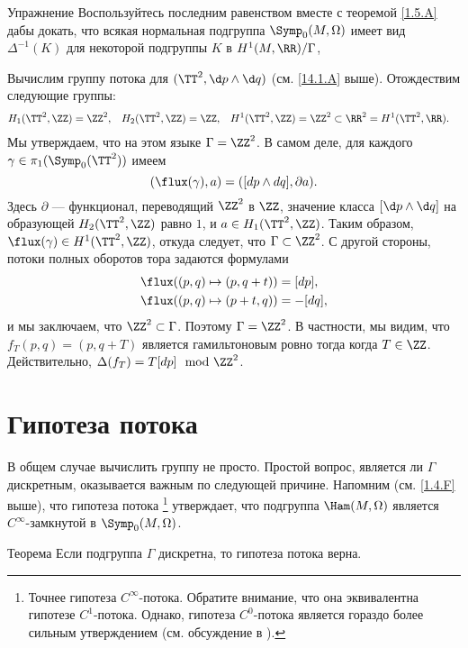 \begin{ex}{Упражнение}\label{14.1.B}
Воспользуйтесь последним равенством вместе с теоремой \ref{1.5.A} дабы докать, что всякая нормальная подгруппа $\Symp_0(M,\Omega)$ имеет вид $\Delta^{-1}(K)$ для некоторой подгруппы $K$ в $H^1(M, \RR)/\Gamma$,
\end{ex}

Вычислим группу потока для $(\TT^2,\d p\wedge \d q)$ (см. \ref{14.1.A} выше).
Отождествим следующие группы: 
\begin{align*}
H_1(\TT^2,\ZZ)&=\ZZ^2,
&
H_2(\TT^2,\ZZ)&=\ZZ,
&
H^1(\TT^2,\ZZ)&=\ZZ^2
\subset
\RR^2=
H^1(\TT^2,\RR).
\end{align*}
Мы утверждаем, что на этом языке $\Gamma = \ZZ^2$.
В самом деле, для каждого $\gamma\in\pi_1(\Symp_0(\TT^2))$ имеем 
\[(\flux(\gamma), a) = ([dp \wedge dq], \partial a).\]
Здесь $\partial$ --- функционал, переводящий $\ZZ^2$ в $\ZZ$, значение
класса $[\d p \wedge \d q]$ на образующей $H_2 (\TT^2,\ZZ)$ равно $1$,
и $a \in H_1 (\TT^2, \ZZ)$. 
Таким образом, $\flux(\gamma)\in H^1(\TT^2,\ZZ)$, откуда следует, что
$\Gamma\subset \ZZ^2$.
С другой стороны, потоки полных оборотов тора задаются формулами 
\begin{align*}
\flux( (p, q) \mapsto (p , q+ t))
&=
[dp],
\\
\flux( (p, q) \mapsto (p+ t , q))
&=
-[dq],
\end{align*}
и мы заключаем, что $\ZZ^2 \subset  \Gamma$.
Поэтому $\Gamma = \ZZ^2$.
В частности, мы видим, что $f_T(p, q) = (p, q + T)$ является
гамильтоновым ровно тогда когда $T \in \ZZ$. 
Действительно, $\Delta(f_T) = T[dp] \mod{\ZZ^2}$.

\section{Гипотеза потока}

В общем случае вычислить группу  не просто. 
Простой вопрос, является ли $\Gamma$ дискретным, оказывается важным по
следующей причине. 
Напомним (см. \ref{1.4.F} выше), что гипотеза потока%
\footnote{Точнее гипотеза $C^\infty$-потока.
Обратите внимание, что она эквивалентна гипотезе $C^1$-потока.
Однако, гипотеза $C^0$-потока является гораздо более сильным утверждением (см. обсуждение в \cite{LMP1}).}
утверждает, что подгруппа $\Ham(M,\Omega)$ является $C^\infty$-замкнутой в $\Symp_0(M,\Omega)$.

\begin{thm}{Теорема}\label{14.2.A}
Если подгруппа $\Gamma$ дискретна, то гипотеза потока верна. 
\end{thm}

